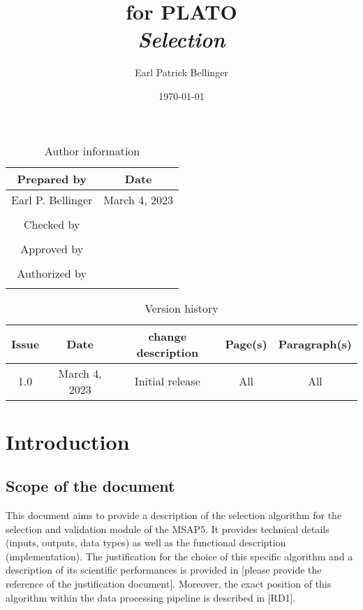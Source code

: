 \documentclass[a4paper, oneside, 11pt, article, english]{memoir}
\author{Earl Patrick Bellinger}
\title{\shorttitle{} for PLATO \\ \Large\textit{Selection}}
\date{\today}
\begin{document}
\maketitle

\begin{table}[htbp]
  \centering
  \caption{Author information}
  \label{tab:author}
  \begin{tabular}{cc}
    \toprule
    Prepared by & Date\\
    \midrule
    Earl P. Bellinger & March 4, 2023 \\
    \\
    Checked by \\
    \midrule
    \\
    Approved by \\
    \midrule
    \\
    Authorized by \\
    \midrule
    \\
    \bottomrule
  \end{tabular}
\end{table}

\begin{table}[htbp]
  \centering
  \caption{Version history}
  \label{tab:version}
  \begin{tabular}{ccccc}
    \toprule
    Issue & Date & \textnumero{} change description & Page(s) & Paragraph(s) \\
    \midrule
    1.0 & March 4, 2023 & Initial release & All & All \\
    \bottomrule
  \end{tabular}
\end{table}


\clearpage
\tableofcontents*
\clearpage


\chapter{Introduction}
\label{chap:intro}

\section{Scope of the document}
\label{sec:scope}

This document aims to provide a description of the selection algorithm for the selection and validation module of the MSAP5. 
It provides technical details (inputs, outputs, data types) as well as the
functional description (implementation). The
justification for the choice of this specific algorithm and a description of its
scientific performances is provided in [please provide the reference of the
justification document]. Moreover, the exact position of this algorithm within
the data processing pipeline is described in [RD1]. 
\end{document}
